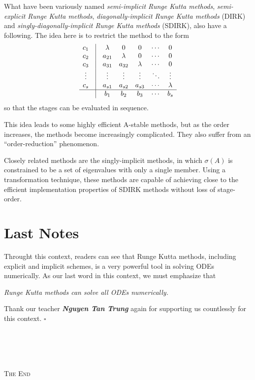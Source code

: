 \documentclass[a4paper,oneside]{book}
\numberwithin{equation}{chapter}
\begin{document}
What have been variously named \textit{semi-implicit Runge Kutta methods}, \textit{semi-explicit Runge Kutta methods}, \textit{diagonally-implicit Runge Kutta methods} (DIRK) and \textit{singly-diagonally-implicit Runge Kutta methods} (SDIRK), also have a following. The idea here is to restrict the method to the form
\begin{align}
\begin{array}{*{20}{c}}
{{c_1}}&\vline& \lambda &0&0& \cdots &0\\
{{c_2}}&\vline& {{a_{21}}}&\lambda &0& \cdots &0\\
{{c_3}}&\vline& {{a_{31}}}&{{a_{32}}}&\lambda & \cdots &0\\
 \vdots &\vline&  \vdots & \vdots & \vdots & \ddots & \vdots \\
{{c_s}}&\vline& {{a_{s1}}}&{{a_{s2}}}&{{a_{s3}}}& \cdots &\lambda \\
\hline
{}&\vline& {{b_1}}&{{b_2}}&{{b_3}}& \cdots &{{b_s}}
\end{array}
\end{align}
so that the stages can be evaluated in sequence.

This idea leads to some highly efficient A-stable methods, but as the order increases, the methods become increasingly complicated. They also suffer from an ``order-reduction'' phenomenon.

Closely  related methods are the singly-implicit methods, in which $\sigma \left(A\right)$ is constrained to be a set of eigenvalues with only a single member. Using a transformation technique, these methods are capable of achieving close to the efficient implementation properties of SDIRK methods without loss of stage-order.
\section*{Last Notes}
Throught this context, readers can see that Runge Kutta methods, including explicit and implicit schemes, is a very powerful tool in solving ODEs numerically. As our last word in this context, we must emphasize that 
\begin{center}
\textit{Runge Kutta methods can solve all ODEs numerically.}
\end{center}
Thank our teacher \textbf{\textit{Nguyen Tan Trung}} again for supporting us countlessly for this context. \hfill $\square$\\
\\
\\
\\
\\
\begin{center}
\textsc{The End}
\end{center}
\newpage 
\printindex
\end{document}

